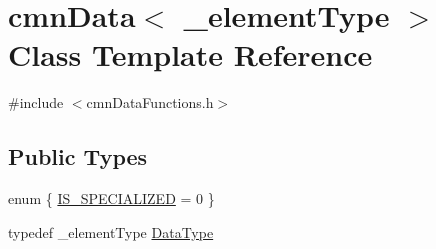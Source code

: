 \hypertarget{classcmn_data}{\section{cmn\-Data$<$ \-\_\-element\-Type $>$ Class Template Reference}
\label{classcmn_data}
}


{\ttfamily \#include $<$cmn\-Data\-Functions.\-h$>$}

\subsection*{Public Types}
\begin{DoxyCompactItemize}
\item 
enum \{ \hyperlink{classcmn_data_a8e15f7bac4709a448e12083e816d59dda72e7c5ce850db7c34c87a0e5f4456c30}{I\-S\-\_\-\-S\-P\-E\-C\-I\-A\-L\-I\-Z\-E\-D} = 0
 \}
\item 
typedef \-\_\-element\-Type \hyperlink{classcmn_data_a353bd6bb0af651b6301e5e2e34587da2}{Data\-Type}
\end{DoxyCompactItemize}
